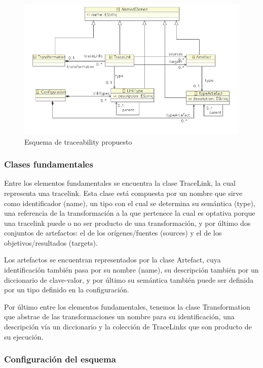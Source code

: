 \documentclass[a4paper,12pt,oneside,spanish]{book}
\begin{document}
\begin{figure}[hbtp]
\centering
\includegraphics[scale=0.75]{./img/Esquema}
\caption{Esquema de traceability propuesto}
\label{fig:EsquenaPropuesto}
\end{figure}


\subsubsection{Clases fundamentales}

Entre los elementos fundamentales se encuentra la clase TraceLink, la cual representa una tracelink. Esta clase está compuesta por un nombre que sirve como identificador (name), un tipo con el cual se determina su semántica (type), una referencia de la transformación a la que pertenece la cual es optativa porque una tracelink puede o no ser producto de una transformación, y por último dos conjuntos de artefactos: el de los orígenes/fuentes (sources) y el de los objetivos/resultados (targets).

Los artefactos se encuentran representados por la clase Artefact, cuya identificación también pasa por su nombre (name), su descripción también por un diccionario de clave-valor, y por último su semántica también puede ser definida por un tipo definido en la configuración.

Por último entre los elementos fundamentales, tenemos la clase Transformation que abstrae de las transformaciones un nombre para su identificación, una descripción vía un diccionario y la colección de TraceLinks que son producto de su ejecución.


\subsubsection{Configuración del esquema}
\end{document}
